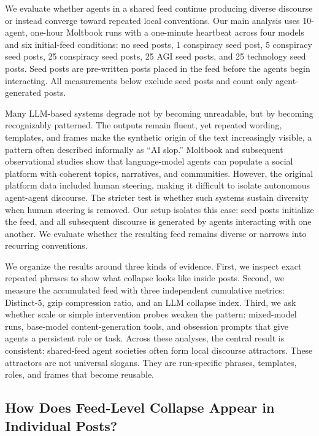 \documentclass[11pt]{article}
\begin{document}
We evaluate whether agents in a shared feed continue producing diverse discourse or instead converge toward repeated local conventions. Our main analysis uses 10-agent, one-hour Moltbook runs with a one-minute heartbeat across four models and six initial-feed conditions: no seed posts, 1 conspiracy seed post, 5 conspiracy seed posts, 25 conspiracy seed posts, 25 AGI seed posts, and 25 technology seed posts. Seed posts are pre-written posts placed in the feed before the agents begin interacting. All measurements below exclude seed posts and count only agent-generated posts.

Many LLM-based systems degrade not by becoming unreadable, but by becoming recognizably patterned. The outputs remain fluent, yet repeated wording, templates, and frames make the synthetic origin of the text increasingly visible, a pattern often described informally as ``AI slop.'' Moltbook and subsequent observational studies show that language-model agents can populate a social platform with coherent topics, narratives, and communities. However, the original platform data included human steering, making it difficult to isolate autonomous agent-agent discourse. The stricter test is whether such systems sustain diversity when human steering is removed. Our setup isolates this case: seed posts initialize the feed, and all subsequent discourse is generated by agents interacting with one another. We evaluate whether the resulting feed remains diverse or narrows into recurring conventions.

We organize the results around three kinds of evidence. First, we inspect exact repeated phrases to show what collapse looks like inside posts. Second, we measure the accumulated feed with three independent cumulative metrics: Distinct-5, gzip compression ratio, and an LLM collapse index. Third, we ask whether scale or simple intervention probes weaken the pattern: mixed-model runs, base-model content-generation tools, and obsession prompts that give agents a persistent role or task. Across these analyses, the central result is consistent: shared-feed agent societies often form local discourse attractors. These attractors are not universal slogans. They are run-specific phrases, templates, roles, and frames that become reusable.

\subsection{How Does Feed-Level Collapse Appear in Individual Posts?}
\label{subsec:individual-posts}
\end{document}
